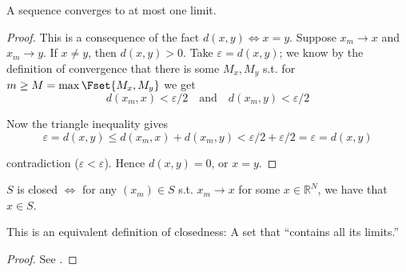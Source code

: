 \documentclass{article}
\begin{document}
\begin{claim}
  A sequence converges to at most one limit.
\end{claim}

\begin{proof}
  This is a consequence of the fact $d(x, y) \iff x = y$. Suppose $x_m \to x$ and $x_m \to y$. If $x \ne y$, then $d(x, y) > 0$. Take $\varepsilon = d(x, y)$; we know by the definition of convergence that there is some $M_x, M_y$ s.t. for $m \ge M = \max\Fset{M_x, M_y}$ we get
  \[
    d(x_m, x) < \varepsilon / 2
    \quad
    \text{and}
    \quad
    d(x_m, y) < \varepsilon / 2
  \]

  Now the triangle inequality gives
  \[
    \varepsilon
    =
    d(x, y)
    \le
    d(x_m, x) + d(x_m, y)
    <
    \varepsilon / 2
    +
    \varepsilon / 2
    =
    \varepsilon
    =
    d(x, y)
  \]

  contradiction ($\varepsilon < \varepsilon$). Hence $d(x, y) = 0$, or $x = y$.
\end{proof}

\begin{theorem}\label{thm:lecture2_closed_sequential}
  $S$ is closed $\iff$ for any $(x_m) \in S$ s.t. $x_m \to x$ for some $x \in \mathbb{R}^N$, we have that $x \in S$.
\end{theorem}

This is an equivalent definition of closedness: A set that ``contains all its limits.''
\begin{proof}
  See .
\end{proof}
\end{document}
